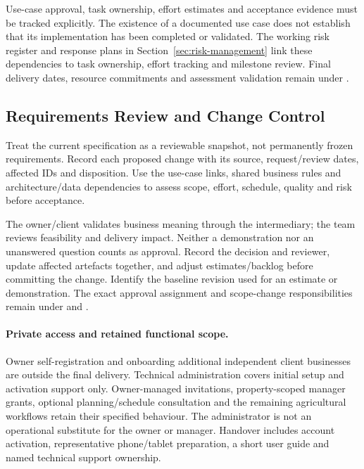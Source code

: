 Use-case approval, task ownership,
effort estimates and acceptance evidence
must be tracked explicitly.
The existence of a documented use case
does not establish that its implementation
has been completed or validated.
The working risk register and response plans in Section~\ref{sec:risk-management}
link these dependencies to task ownership, effort tracking and milestone review.
Final delivery dates, resource commitments and assessment validation remain under
.

\subsection{Requirements Review and Change Control}\label{sec:requirements-change}
Treat the current specification as a reviewable snapshot, not permanently frozen
requirements. Record each proposed change with its source, request/review dates,
affected IDs and disposition. Use the use-case links, shared business rules and
architecture/data dependencies to assess scope, effort, schedule, quality and risk
before acceptance.

The owner/client validates business meaning through the intermediary; the team
reviews feasibility and delivery impact. Neither a demonstration nor an unanswered
question counts as approval. Record the decision and reviewer, update affected
artefacts together, and adjust estimates/backlog before committing the change.
Identify the baseline revision used for an estimate or demonstration. The exact
approval assignment and scope-change responsibilities remain under 
and .



\paragraph{Private access and retained functional scope.}
Owner self-registration and onboarding additional independent client businesses
are outside the final delivery. Technical administration covers initial setup and
activation support only. Owner-managed invitations, property-scoped manager grants,
optional planning/schedule consultation and the remaining agricultural workflows
retain their specified behaviour. The administrator is not an operational substitute
for the owner or manager. Handover includes account activation, representative
phone/tablet preparation, a short user guide and named technical support ownership.
